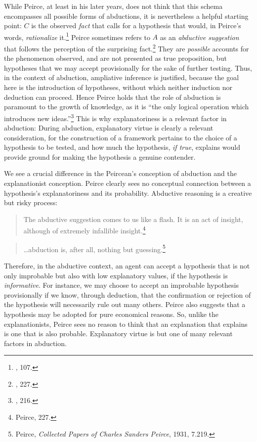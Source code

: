 While Peirce, at least in his later years, does not think that this schema encompasses all possible forms of abductions, it is nevertheless a helpful starting point: \(C\) is the observed \emph{fact} that calls for a
hypothesis that would, in Peirce's words, \emph{rationalize}
it.\footnote{\cite{essentialpeirce2}, 107.}
Peirce sometimes refers to \(A\) as an \emph{abductive suggestion} that
follows the perception of the surprising fact.\footnote{\cite{essentialpeirce2}, 227.}
They are \emph{possible} accounts for the phenomenon observed, and are
not presented as true proposition, but hypotheses that we may accept
provisionally for the sake of further testing. Thus, in the context of
abduction, ampliative inference is justified, because the goal here is
the introduction of hypotheses, without which neither induction nor
deduction can proceed. Hence Peirce holds that the role of abduction is
paramount to the growth of knowledge, as it is ``the only logical
operation which introduces new ideas.''\footnote{\cite{essentialpeirce2}, 216.} This is
why explanatoriness is a relevant factor in abduction: During abduction,
explanatory virtue is clearly a relevant consideration, for the
construction of a framework pertains to the choice of a hypothesis to be
tested, and how much the hypothesis, \emph{if true}, explains would
provide ground for making the hypothesis a genuine contender.

We see a crucial difference in the Peircean's conception of abduction
and the explanationist conception. Peirce clearly sees no conceptual
connection between a hypothesis's explanatoriness and its probability.
Abductive reasoning is a creative but risky process:

\begin{quote}
The abductive suggestion comes to us like a flash. It is an act of
insight, although of extremely infallible insight.\footnote{Peirce, 227.}
\end{quote}

\begin{quote}
\ldots{}abduction is, after all, nothing but guessing.\footnote{Peirce,
  \emph{Collected Papers of Charles Sanders Peirce}, 1931, 7.219.}
\end{quote}

Therefore, in the abductive context, an agent can accept a hypothesis
that is not only improbable but also with low explanatory values, if the
hypothesis is \emph{informative}. For instance, we may choose to accept
an improbable hypothesis provisionally if we know, through deduction,
that the confirmation or rejection of the hypothesis will necessarily
rule out many others. Peirce also suggests that a hypothesis may be
adopted for pure economical reasons. So, unlike the explanationists,
Peirce sees no reason to think that an explanation that explains is one
that is also probable. Explanatory virtue is but one of many relevant
factors in abduction.


